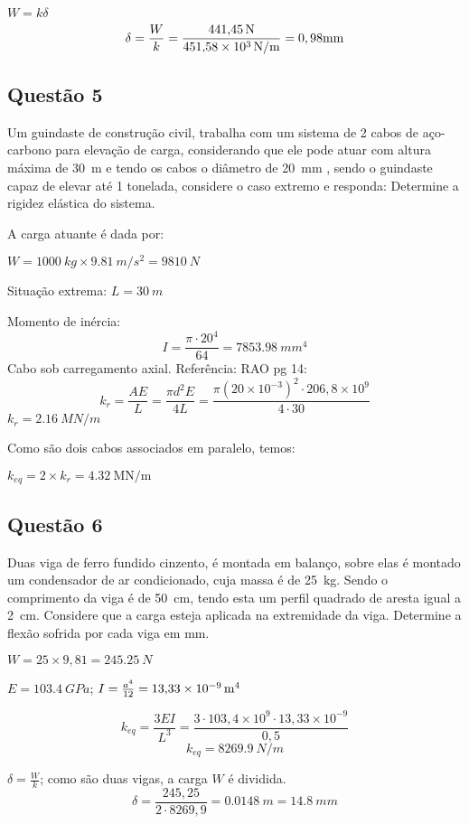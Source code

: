 $W=k\delta$
\[
    \delta=\frac{W}{k}=\frac{\SI{441,45}{\newton}}{\SI{451,58d
    3}{\newton\per\meter}}=0,98\mm
\]

\subsection{Questão 5}
Um guindaste de construção civil, trabalha com um sistema de 2 cabos de aço-carbono para
elevação de carga, considerando que ele pode atuar com altura máxima de \SI{30}{m} e tendo os cabos o
diâmetro de \SI{20}{mm} , sendo o guindaste capaz de elevar até 1 tonelada, considere o caso extremo e responda:
Determine a rigidez elástica do sistema.

\resol
A carga atuante é dada por:

$W = \SI{1000}{kg}\times \SI{9,81}{m /s^2} = \SI{9810}{N}$

Situação extrema: $L = \SI{30}{m}$

Momento de inércia:
\[
    I = \frac{\pi \cdot 20^{4}}{64}= \SI{7853,98}{mm^4}
\]
Cabo sob carregamento axial. Referência: RAO pg 14:
\[
    k_r=\frac{A E}{L}=\frac{\pi d^{2}E}{4L} = \frac{\pi (20\times 10^{-3})^2 \cdot 206,8 \times 10^9 }{4\cdot 30}
\]
$k_{r}=\SI{2,16}{MN /m}$

Como são dois cabos associados em paralelo, temos:

$k_{eq}= 2\times k_{r}= \SI{4,32}{\mega\newton\per\meter}$

\subsection{Questão 6}%
Duas viga de ferro fundido cinzento, é montada em balanço, sobre elas é montado um
condensador de ar condicionado, cuja massa é de \SI{25}{kg}. Sendo o comprimento da viga é de \SI{50}{cm}, tendo
esta um perfil quadrado de aresta igual a \SI{2}{cm}. Considere que a carga esteja aplicada na extremidade da
viga. Determine a flexão sofrida por cada viga em mm.

\resol
$W=25\times 9,81 = \SI{245,25}{N}$

$E=\SI{103,4}{GPa}$; $I=\frac{a^4}{12}=\SI{13,33d-9}{m^4}$

\[ k_{eq}=\frac{3E I}{L^3}=\frac{3\cdot 103,4\times 10^{9} \cdot 13,33 \times 10^{-9}}{0,5} \]
\[
k_{eq} = \SI{8269,9}{N /m}
\]

$\delta = \frac{W}{k}$; como são duas vigas, a carga $W$ é dividida.
\[
\delta = \frac{245,25}{2\cdot 8269,9} = \SI{0,0148}{m} = \SI{14,8}{mm}
\]
